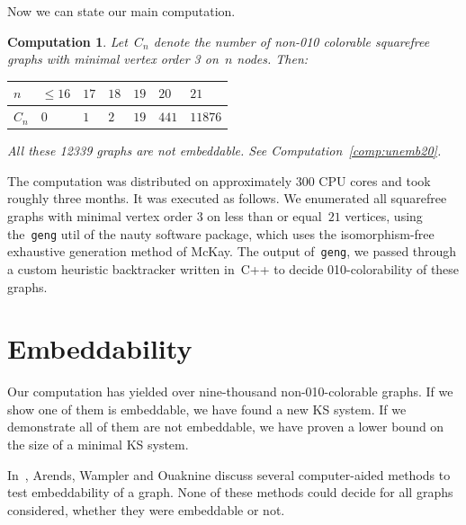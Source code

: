 \documentclass[adraft,copyright,creativecommons]{eptcs}
\newcounter{main}
\newtheorem{comp}[main]{Computation}
\theoremstyle{definition}
\theoremstyle{remark}
\begin{document}
Now we can state our main computation.
\begin{comp}
    Let~$C_n$ denote the number of non-010 colorable squarefree
    graphs with minimal vertex order 3 on~$n$ nodes.  Then:

    \begin{center}
    \begin{tabular}{l|llllll}
        $n$ & $\leq 16$
            & $17$
            & $18$
            & $19$
            & $20$
            & $21$ \\
        \hline
        $C_n$ & $0$
            & $1$
            & $2$
            & $19$
            & $441$
            & $11876$
    \end{tabular}
    \end{center}

    All these 12339 graphs are not embeddable.
    See Computation~\ref{comp:unemb20}.
\end{comp}
The computation was distributed on approximately 300 CPU cores
and took roughly three months.
It was executed as follows.
We enumerated all squarefree graphs with minimal vertex
order 3 on less than or equal~$21$ vertices,
using the~\texttt{geng} util of the nauty software package,
which uses the isomorphism-free exhaustive generation
method of McKay\cite{geng}.
The output of~\texttt{geng}, we passed through
a custom heuristic backtracker written in~C++
to decide 010-colorability of these graphs.

\section{Embeddability}
Our computation has yielded over nine-thousand non-010-colorable graphs.
If we show one of them is embeddable, we have found a new KS system.
If we demonstrate all of them are not embeddable, we have
proven a lower bound on the size of a minimal KS system.

In~\cite{aow11}, Arends, Wampler and Ouaknine discuss several
computer-aided methods
to test embeddability of a graph.  None of these methods could decide
for all graphs considered, whether they were embeddable or not.
\end{document}
